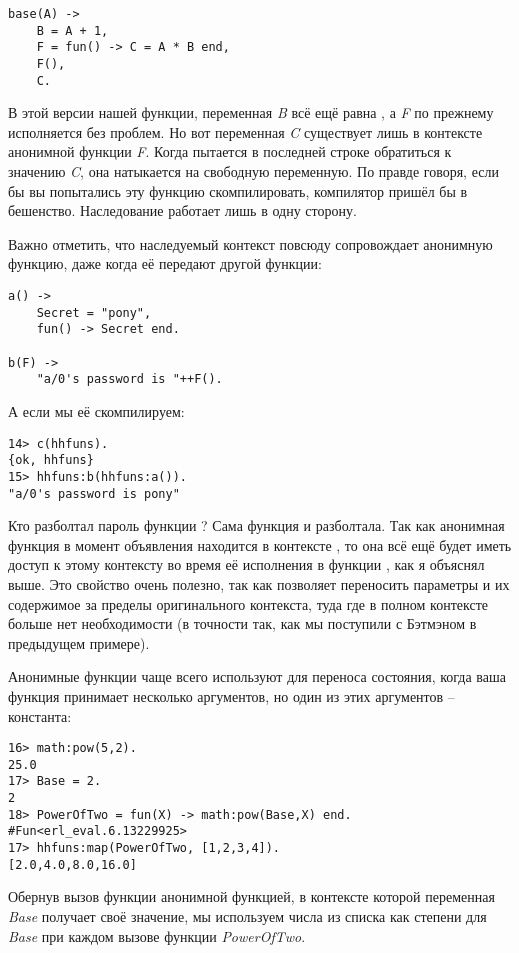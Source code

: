 \begin{lstlisting}[style=erlang]
base(A) ->
    B = A + 1,
    F = fun() -> C = A * B end,
    F(),
    C.
\end{lstlisting}

В этой версии нашей функции, переменная \emph{B} всё ещё равна , а \emph{F} по прежнему исполняется без проблем.
Но вот переменная \emph{C} существует лишь в контексте анонимной функции \emph{F}.
Когда  пытается в последней строке обратиться к значению \emph{C}, она натыкается на свободную переменную.
По правде говоря, если бы вы попытались эту функцию скомпилировать, компилятор пришёл бы в бешенство.
Наследование работает лишь в одну сторону.

Важно отметить, что наследуемый контекст повсюду сопровождает анонимную функцию, даже когда её передают другой функции:
\begin{lstlisting}[style=erlang]
a() ->
    Secret = "pony",
    fun() -> Secret end.
 
b(F) ->
    "a/0's password is "++F().
\end{lstlisting}

А если мы её скомпилируем:
\begin{lstlisting}[style=erlang]
14> c(hhfuns).
{ok, hhfuns}
15> hhfuns:b(hhfuns:a()).
"a/0's password is pony"
\end{lstlisting}

Кто разболтал пароль функции ?
Сама функция  и разболтала.
Так как анонимная функция в момент объявления находится в контексте , то она всё ещё будет иметь доступ к этому контексту во время её исполнения в функции , как я объяснял выше.
Это свойство очень полезно, так как позволяет переносить параметры и их содержимое за пределы оригинального контекста, туда где в полном контексте больше нет необходимости (в точности так, как мы поступили с Бэтмэном в предыдущем примере).

Анонимные функции чаще всего используют для переноса состояния, когда ваша функция принимает несколько аргументов, но один из этих аргументов \--- константа:
\begin{lstlisting}[style=erlang]
16> math:pow(5,2).
25.0
17> Base = 2.
2
18> PowerOfTwo = fun(X) -> math:pow(Base,X) end.
#Fun<erl_eval.6.13229925>
17> hhfuns:map(PowerOfTwo, [1,2,3,4]).
[2.0,4.0,8.0,16.0]
\end{lstlisting}

Обернув вызов функции  анонимной функцией, в контексте которой переменная \emph{Base} получает своё значение, мы используем числа из списка как степени для \emph{Base} при каждом вызове функции \emph{PowerOfTwo}.

